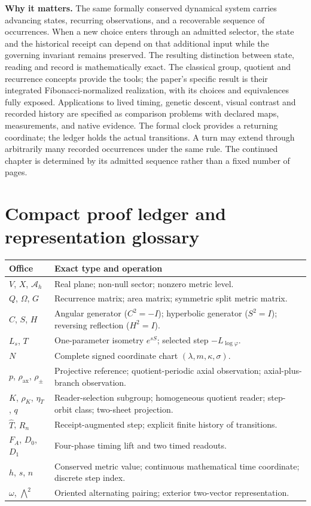 \documentclass[10pt,letterpaper]{article}
\theoremstyle{definition}\newtheorem{definition}[theorem]{Definition}
\newcommand{\Ah}{\mathcal A_h}
\newcommand{\ph}{\varphi}
\newcommand{\rhoax}{\rho_{\mathrm{ax}}}
\newcommand{\rhos}{\rho_{\pm}}
\newcommand{\etaT}{\eta_T}
\begin{document}
\textbf{Why it matters.} The same formally conserved dynamical system carries advancing states, recurring observations, and a recoverable sequence of occurrences. When a new choice enters through an admitted selector, the state and the historical receipt can depend on that additional input while the governing invariant remains preserved. The resulting distinction between state, reading and record is mathematically exact. The classical group, quotient and recurrence concepts provide the tools; the paper's specific result is their integrated Fibonacci-normalized realization, with its choices and equivalences fully exposed. Applications to lived timing, genetic descent, visual contrast and recorded history are specified as comparison problems with declared maps, measurements, and native evidence. The formal clock provides a returning coordinate; the ledger holds the actual transitions. A turn may extend through arbitrarily many recorded occurrences under the same rule. The continued chapter is determined by its admitted sequence rather than a fixed number of pages.

\appendix
\section{Compact proof ledger and representation glossary}
\begin{tabularx}{\linewidth}{@{}p{1.38in}X@{}}
\toprule
\textbf{Office} & \textbf{Exact type and operation}\\\midrule
$V$, $X$, $\Ah$ & Real plane; non-null sector; nonzero metric level.\\
$Q$, $\Omega$, $G$ & Recurrence matrix; area matrix; symmetric split metric matrix.\\
$C$, $S$, $H$ & Angular generator ($C^2=-I$); hyperbolic generator ($S^2=I$); reversing reflection ($H^2=I$).\\
$L_s$, $T$ & One-parameter isometry $e^{sS}$; selected step $-L_{\log\ph}$.\\
$N$ & Complete signed coordinate chart $(\lambda,m,\kappa,\sigma)$.\\
$p$, $\rhoax$, $\rhos$ & Projective reference; quotient-periodic axial observation; axial-plus-branch observation.\\
$K$, $\rho_K$, $\etaT$, $q$ & Reader-selection subgroup; homogeneous quotient reader; step-orbit class; two-sheet projection.\\
$\widehat T$, $R_n$ & Receipt-augmented step; explicit finite history of transitions.\\
$F_A$, $D_0$, $D_1$ & Four-phase timing lift and two timed readouts.\\
$h$, $s$, $n$ & Conserved metric value; continuous mathematical time coordinate; discrete step index.\\
$\omega$, $\bigwedge^2$ & Oriented alternating pairing; exterior two-vector representation.\\
\bottomrule
\end{tabularx}
\end{document}

